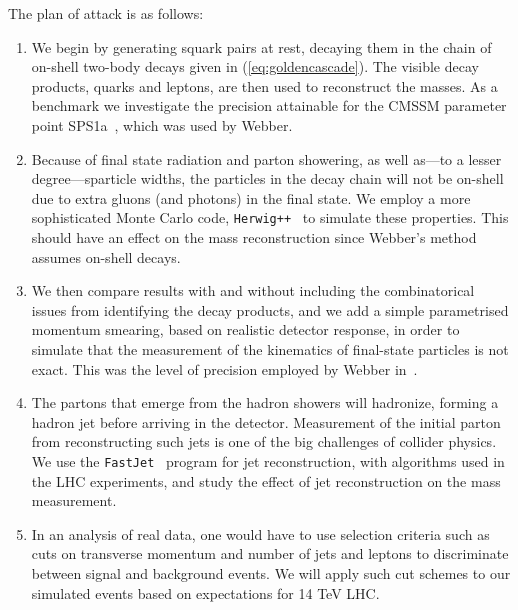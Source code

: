 \documentclass[twoside,english]{uiofysmaster}
\begin{document}
The plan of attack is as follows:
\begin{enumerate}
	\item We begin by generating squark pairs at rest, decaying them in the chain of on-shell two-body decays given in (\ref{eq:goldencascade}). The visible decay products, quarks and leptons, are then used to reconstruct the masses. As a benchmark we investigate the precision attainable for the CMSSM parameter point SPS1a~\cite{Allanach:2002nj}, which was used by Webber. 
	\item Because of final state radiation and parton showering, as well as---to a lesser degree---sparticle widths, the particles in the decay chain will not be on-shell due to extra gluons (and photons) in the final state. We employ a more sophisticated Monte Carlo code, {\tt Herwig++}~\cite{Bahr:2008pv}  to simulate these properties. This should have an effect on the mass reconstruction since Webber's method assumes on-shell decays.
	\item	We then compare results with and without including the combinatorical issues from identifying the decay products, and we add a simple parametrised momentum smearing, based on realistic detector response, in order to simulate that the measurement of the kinematics of final-state particles is not exact. This was the level of precision employed by Webber in~\cite{Webber:2009vm}.
	\item The partons that emerge from the hadron showers will hadronize, forming a hadron jet before arriving in the detector. Measurement of the initial parton from reconstructing such jets is one of the big challenges of collider physics. We use the {\tt FastJet}~\cite{Cacciari:2011ma} program for jet reconstruction, with algorithms used in the LHC experiments, and study the effect of jet reconstruction on the mass measurement.
	\item In an analysis of real data, one would have to use selection criteria such as cuts on transverse momentum and number of jets and leptons to discriminate between signal and background events. We will apply such cut schemes to our simulated events based on expectations for 14 TeV LHC. 

\end{enumerate}
\end{document}
